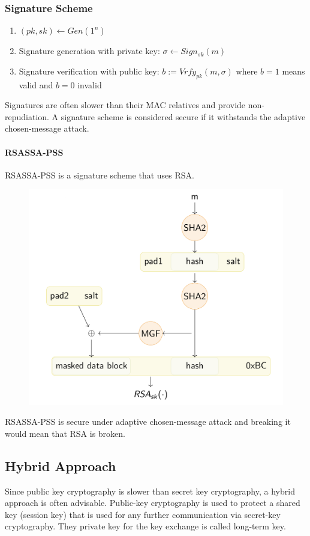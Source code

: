 \subsubsection{Signature Scheme}
\begin{enumerate}
  \item $(pk,sk) \leftarrow Gen(1^n)$
  \item Signature generation with private key: $\sigma \leftarrow Sign_{sk}(m)$
  \item Signature verification with public key: $b := Vrfy_{pk}(m,\sigma)$ where $b = 1$ means valid and $b = 0$ invalid
\end{enumerate}
Signatures are often slower than their MAC relatives and provide non-repudiation.
A signature scheme is considered secure if it withstands the adaptive chosen-message attack.
\newpage

\paragraph{RSASSA-PSS}
RSASSA-PSS is a signature scheme that uses RSA\@.
\begin{figure}[H]
  \centering
  \includegraphics[width=.8\textwidth]{figures/rsassa-pss.png}
\end{figure}
RSASSA-PSS is secure under adaptive chosen-message attack and breaking it would mean that RSA is broken.

\subsection{Hybrid Approach}
Since public key cryptography is slower than secret key cryptography, a hybrid approach is often advisable.
Public-key cryptography is used to protect a shared key (session key) that is used for any further communication via secret-key cryptography.
They private key for the key exchange is called long-term key.\\

